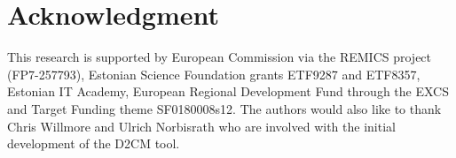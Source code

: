 \documentclass[a4paper,10pt]{article}
\begin{document}
\section*{Acknowledgment}
This research is supported by European Commission via the REMICS project (FP7-257793), Estonian Science Foundation grants ETF9287 and ETF8357, Estonian IT Academy, European Regional Development Fund through the EXCS and Target Funding theme SF0180008s12. The authors would also like to thank Chris Willmore and Ulrich Norbisrath who are involved with the initial development of the D2CM tool.



\end{document}
